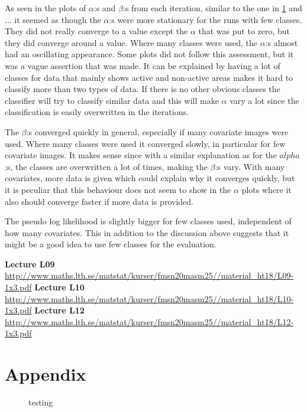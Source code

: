 \documentclass[a4paper,english]{article}
\newcommand{\sexion}[1]{\section{#1}}
\begin{document}
As seen in the plots of $\alpha$:s and $\beta$:s from each iteration, similar to the one in \ref{fig:test} and ... it seemed as though the $\alpha$:s were more stationary for the runs with few classes. They did not really converge to a value except the $\alpha$ that was put to zero, but they did converge around a value. Where many classes were used, the $\alpha$:s almost had an oscillating appearance. Some plots did not follow this assessment, but it was a vague assertion that was made.
It can be explained by having a lot of classes for data that mainly shows active and non-active areas makes it hard to classify more than two types of data. If there is no other obvious classes the classifier will try to classify similar data and this will make $\alpha$ vary a lot since the classification is easily overwritten in the iterations.

The $\beta$:s converged quickly in general, especially if many covariate images were used. Where many classes were used it converged slowly, in particular for few covariate images. It makes sense since with a similar explanation as for the $alpha$:s, the classes are overwritten a lot of times, making the $\beta$:s vary. With many covariates, more data is given which could explain why it converges quickly, but it is peculiar that this behaviour does not seem to show in the $\alpha$ plots where it also should converge faster if more data is provided.

The pseudo log likelihood is slightly bigger for few classes used, independent of how many covariates. This in addition to the discussion above suggests that it might be a good idea to use few classes for the evaluation.


\newpage

\begin{thebibliography}{37}
  \textbf{Lecture L09} \\
\url{http://www.maths.lth.se/matstat/kurser/fmsn20masm25//material_ht18/L09-1x3.pdf}
  \textbf{Lecture L10} \\
\url{http://www.maths.lth.se/matstat/kurser/fmsn20masm25//material_ht18/L10-1x3.pdf}
  \textbf{Lecture L12} \\
\url{http://www.maths.lth.se/matstat/kurser/fmsn20masm25//material_ht18/L12-1x3.pdf}
\end{thebibliography}
\pagebreak{}

\sexion{Appendix}
\begin{figure}[H]
  \centering
  \caption{testing}
  \label{fig:test}
\end{figure}


% 


\pagebreak{}
\thispagestyle{empty}
\end{document}

